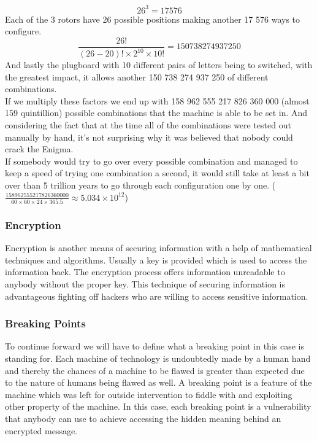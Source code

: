 \documentclass[conference,compsoc]{IEEEtran}
\begin{document}
\begin{equation}
    26^3=17576
\end{equation}
Each of the 3 rotors have 26 possible positions making another 17 576 ways to configure.\\
\begin{equation}
    \frac{26!}{(26-20)!\times2^{10}\times10!}=150738274937250
\end{equation}
And lastly the plugboard with 10 different pairs of letters being to switched, with the greatest impact, it allows another 150 738 274 937 250 of different combinations.\\
If we multiply these factors we end up with 158 962 555 217 826 360 000 (almost 159 quintillion) possible combinations that the machine is able to be set in. And considering the fact that at the time all of the combinations were tested out manually by hand, it's not surprising why it was believed that nobody could crack the Enigma.\\
If somebody would try to go over every possible combination and managed to keep a speed of trying one combination a second, it would still take at least a bit over than 5 trillion years to go through each configuration one by one. ($\frac{158962555217826360000}{60\times60\times24\times365.5}\approx5.034\times10^{12}$)

\subsubsection{Encryption} Encryption is another means of securing information with a help of mathematical techniques and algorithms. Usually a key is provided which is used to access the information back. The encryption process offers information unreadable to anybody without the proper key. This technique of securing information is advantageous fighting off hackers who are willing to access sensitive information.\\

\subsubsection{Breaking Points} To continue forward we will have to define what a breaking point in this case is standing for. Each machine of technology is undoubtedly made by a human hand and thereby the chances of a machine to be flawed is greater than expected due to the nature of humans being flawed as well. A breaking point is a feature of the machine which was left for outside intervention to fiddle with and exploiting other property of the machine. In this case, each breaking point is a vulnerability that anybody can use to achieve accessing the hidden meaning behind an encrypted message.\\
\end{document}
